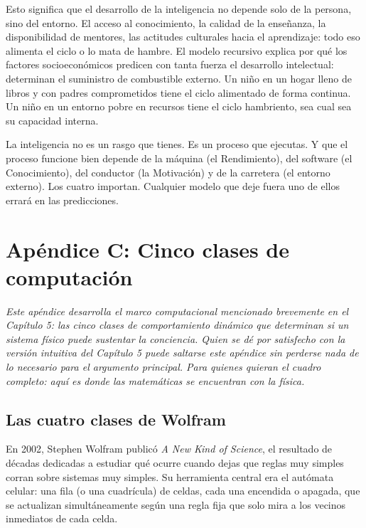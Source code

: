 \documentclass[11pt, twoside, openright]{book}
\begin{document}
Esto significa que el desarrollo de la inteligencia no depende solo de la persona, sino del entorno. El acceso al conocimiento, la calidad de la enseñanza, la disponibilidad de mentores, las actitudes culturales hacia el aprendizaje: todo eso alimenta el ciclo o lo mata de hambre. El modelo recursivo explica por qué los factores socioeconómicos predicen con tanta fuerza el desarrollo intelectual: determinan el suministro de combustible externo. Un niño en un hogar lleno de libros y con padres comprometidos tiene el ciclo alimentado de forma continua. Un niño en un entorno pobre en recursos tiene el ciclo hambriento, sea cual sea su capacidad interna.

La inteligencia no es un rasgo que tienes. Es un proceso que ejecutas. Y que el proceso funcione bien depende de la máquina (el Rendimiento), del software (el Conocimiento), del conductor (la Motivación) y de la carretera (el entorno externo). Los cuatro importan. Cualquier modelo que deje fuera uno de ellos errará en las predicciones.


\chapter*{Apéndice C: Cinco clases de computación}

\textit{Este apéndice desarrolla el marco computacional mencionado brevemente en el Capítulo 5: las cinco clases de comportamiento dinámico que determinan si un sistema físico puede sustentar la conciencia. Quien se dé por satisfecho con la versión intuitiva del Capítulo 5 puede saltarse este apéndice sin perderse nada de lo necesario para el argumento principal. Para quienes quieran el cuadro completo: aquí es donde las matemáticas se encuentran con la física.}

\section*{Las cuatro clases de Wolfram}

En 2002, Stephen Wolfram publicó \textit{A New Kind of Science}, el resultado de décadas dedicadas a estudiar qué ocurre cuando dejas que reglas muy simples corran sobre sistemas muy simples. Su herramienta central era el autómata celular: una fila (o una cuadrícula) de celdas, cada una encendida o apagada, que se actualizan simultáneamente según una regla fija que solo mira a los vecinos inmediatos de cada celda.
\end{document}
